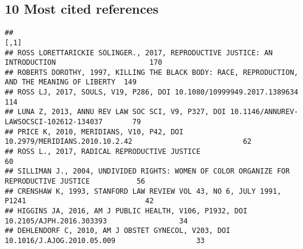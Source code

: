 \documentclass[
]{article}
\newenvironment{Shaded}{\begin{snugshade}}{\end{snugshade}}
\newcommand{\AttributeTok}[1]{\textcolor[rgb]{0.13,0.29,0.53}{#1}}
\newcommand{\DecValTok}[1]{\textcolor[rgb]{0.00,0.00,0.81}{#1}}
\newcommand{\FunctionTok}[1]{\textcolor[rgb]{0.13,0.29,0.53}{\textbf{#1}}}
\newcommand{\NormalTok}[1]{#1}
\newcommand{\OtherTok}[1]{\textcolor[rgb]{0.56,0.35,0.01}{#1}}
\newcommand{\SpecialCharTok}[1]{\textcolor[rgb]{0.81,0.36,0.00}{\textbf{#1}}}
\newcommand{\StringTok}[1]{\textcolor[rgb]{0.31,0.60,0.02}{#1}}
\begin{document}
\subsection{10 Most cited references}\label{most-cited-references}

\begin{Shaded}
\end{Shaded}

\begin{verbatim}
##                                                                                               [,1]
## ROSS LORETTARICKIE SOLINGER., 2017, REPRODUCTIVE JUSTICE: AN INTRODUCTION                      170
## ROBERTS DOROTHY, 1997, KILLING THE BLACK BODY: RACE, REPRODUCTION, AND THE MEANING OF LIBERTY  149
## ROSS LJ, 2017, SOULS, V19, P286, DOI 10.1080/10999949.2017.1389634                             114
## LUNA Z, 2013, ANNU REV LAW SOC SCI, V9, P327, DOI 10.1146/ANNUREV-LAWSOCSCI-102612-134037       79
## PRICE K, 2010, MERIDIANS, V10, P42, DOI 10.2979/MERIDIANS.2010.10.2.42                          62
## ROSS L., 2017, RADICAL REPRODUCTIVE JUSTICE                                                     60
## SILLIMAN J., 2004, UNDIVIDED RIGHTS: WOMEN OF COLOR ORGANIZE FOR REPRODUCTIVE JUSTICE           56
## CRENSHAW K, 1993, STANFORD LAW REVIEW VOL 43, NO 6, JULY 1991, P1241                            42
## HIGGINS JA, 2016, AM J PUBLIC HEALTH, V106, P1932, DOI 10.2105/AJPH.2016.303393                 34
## DEHLENDORF C, 2010, AM J OBSTET GYNECOL, V203, DOI 10.1016/J.AJOG.2010.05.009                   33
\end{verbatim}
\end{document}
